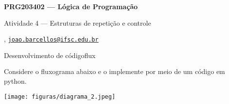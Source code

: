 





\begin{Large}
    \textbf{PRG203402 --- Lógica de Programação}
    
    Atividade 4 --- Estruturas de repetição e controle \hfill {}
\end{Large}

\vspace{1ex}
\textbf{} , \href{mailto:joao.barcellos@ifsc.edu.br}{\texttt{joao.barcellos@ifsc.edu.br}}\\
\textbf{}


\vspace{2ex}

\begin{problem}{Desenvolvimento de código}{flux}

Considere o fluxograma abaixo e o implemente por meio de um código em python.

\begin{center}
    \texttt{[image: figuras/diagrama\_2.jpeg]}
\end{center}

\end{problem}

\newpage

\printbibliography


